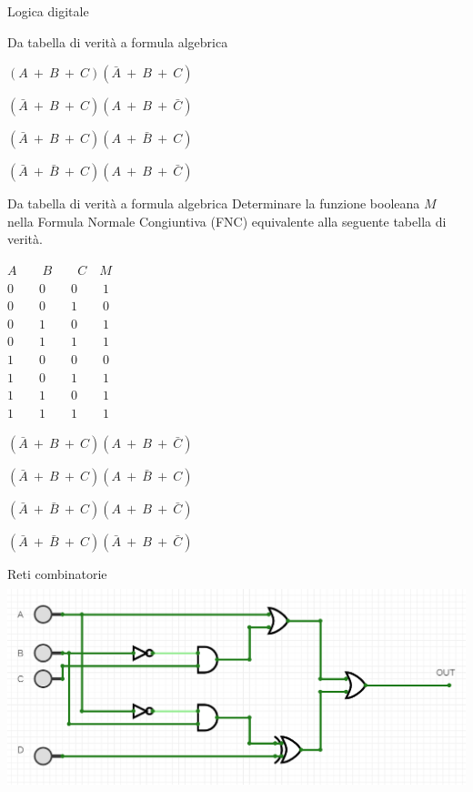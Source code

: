 \documentclass[11pt]{article}
\begin{document}
\begin{quiz}{Logica digitale}
\begin{multi}[points=1,shuffle=true]{Da tabella di verità a formula algebrica}
    \item* $(A\ +\ B\ +\ C)(\bar{A}\ +\ B\ +\ C)$
    \item $(\bar{A}\ +\ B\ +\ C)(A\ +\ B\ +\ \bar{C})$
    \item $(\bar{A}\ +\ B\ +\ C)(A\ +\ \bar{B}\ +\ C)$
    \item $(\bar{A}\ +\ \bar{B}\ +\ C)(A\ +\ B\ +\ \bar{C})$
\end{multi}

\begin{multi}[points=1,shuffle=true]{Da tabella di verità a formula algebrica}
    Determinare la funzione booleana $M$ nella Formula Normale Congiuntiva (FNC) equivalente alla seguente tabella di verit\`{a}.

    $A \qquad  B \qquad  C \quad M$ \\
    $0 \qquad 0 \qquad 0 \qquad 1$ \\
    $0 \qquad 0 \qquad 1 \qquad 0$ \\
    $0 \qquad 1 \qquad 0 \qquad 1$ \\
    $0 \qquad 1 \qquad 1 \qquad 1$ \\
    $1 \qquad 0 \qquad 0 \qquad 0$ \\
    $1 \qquad 0 \qquad 1 \qquad 1$ \\
    $1 \qquad 1 \qquad 0 \qquad 1$ \\
    $1 \qquad 1 \qquad 1 \qquad 1$ \\
    
    \item* $(\bar{A}\ +\ B\ +\ C)(A\ +\ B\ +\ \bar{C})$
    \item $(\bar{A}\ +\ B\ +\ C)(A\ +\ \bar{B}\ +\ C)$
    \item $(\bar{A}\ +\ \bar{B}\ +\ C)(A\ +\ B\ +\ \bar{C})$
    \item $(\bar{A}\ +\ \bar{B}\ +\ C)(\bar{A}\ +\ B\ +\ \bar{C})$
\end{multi}

\begin{multi}[points=1,shuffle=true]{Reti combinatorie}
    \includegraphics[height=6cm]{figures/comb1.png}


\end{multi}
\end{quiz}
\end{document}
